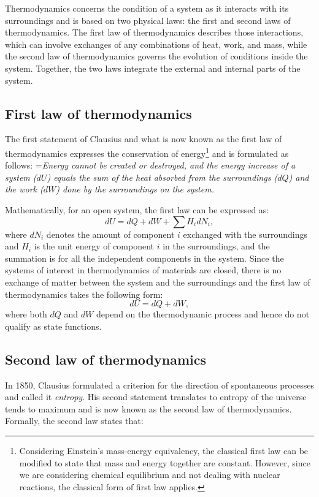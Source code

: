     Thermodynamics concerns the condition of a system as it interacts with its surroundings and is based on two physical laws: the first and second laws of thermodynamics. The first law of thermodynamics describes those interactions, which can involve exchanges of any combinations of heat, work, and mass, while the second law of thermodynamics governs the evolution of conditions inside the system. Together, the two laws integrate the external and internal parts of the system.

\subsection{First law of thermodynamics}
    The first statement of Clausius and what is now known as the first law of thermodynamics expresses the conservation of energy\footnote{Considering Einstein's mass-energy equivalency, the classical first law can be modified to state that mass and energy together are constant. However, since we are considering chemical equilibrium and not dealing with nuclear reactions, the classical form of first law applies.} and is formulated as follows:
    \hangindent=\parindent \emph{Energy cannot be created or destroyed, and the energy increase of a system ($dU$) equals the sum of the heat absorbed from the surroundings ($dQ$) and the work ($dW$) done by the surroundings on the system.}

\noindent Mathematically, for an open system, the first law can be expressed as:
\begin{equation}\label{eqn:flot}
    dU = dQ + dW + \sum H_i dN_i,
\end{equation}
where $dN_i$ denotes the amount of component $i$ exchanged with the surroundings and $H_i$ is the unit energy of component $i$ in the surroundings, and the summation is for all the independent components in the system. Since the systems of interest in thermodynamics of materials are closed, there is no exchange of matter between the system and the surroundings and the first law of thermodynamics takes the following form:
\begin{equation}\label{eqn:flot1}
    dU = dQ + dW,
\end{equation}
where both $dQ$ and $dW$ depend on the thermodynamic process and hence do not qualify as state functions.

\subsection{Second law of thermodynamics}
In 1850, Clausius formulated a criterion for the direction of spontaneous processes and called it \emph{entropy}. His second statement translates to entropy of the universe tends to maximum and is now known as the second law of thermodynamics. Formally, the second law states that:

